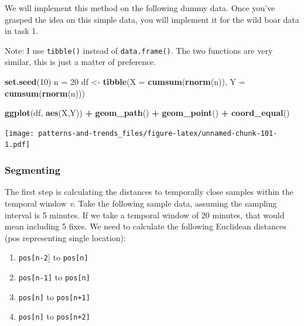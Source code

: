 \documentclass[]{book}
\newenvironment{Shaded}{\begin{snugshade}}{\end{snugshade}}
\newcommand{\KeywordTok}[1]{\textcolor[rgb]{0.13,0.29,0.53}{\textbf{#1}}}
\newcommand{\DataTypeTok}[1]{\textcolor[rgb]{0.13,0.29,0.53}{#1}}
\newcommand{\DecValTok}[1]{\textcolor[rgb]{0.00,0.00,0.81}{#1}}
\newcommand{\StringTok}[1]{\textcolor[rgb]{0.31,0.60,0.02}{#1}}
\newcommand{\OperatorTok}[1]{\textcolor[rgb]{0.81,0.36,0.00}{\textbf{#1}}}
\newcommand{\NormalTok}[1]{#1}
\providecommand{\tightlist}{%
  \setlength{\itemsep}{0pt}\setlength{\parskip}{0pt}}
\begin{document}
We will implement this method on the following dummy data. Once you've
grasped the idea on this simple data, you will implement it for the wild
boar data in task 1.

Note: I use \texttt{tibble()} instead of \texttt{data.frame()}. The two
functions are very similar, this is just a matter of preference.

\begin{Shaded}
\begin{Highlighting}[]
\KeywordTok{set.seed}\NormalTok{(}\DecValTok{10}\NormalTok{)}
\NormalTok{n =}\StringTok{ }\DecValTok{20}
\NormalTok{df <-}\StringTok{ }\KeywordTok{tibble}\NormalTok{(}\DataTypeTok{X =} \KeywordTok{cumsum}\NormalTok{(}\KeywordTok{rnorm}\NormalTok{(n)), }\DataTypeTok{Y =} \KeywordTok{cumsum}\NormalTok{(}\KeywordTok{rnorm}\NormalTok{(n)))}

\KeywordTok{ggplot}\NormalTok{(df, }\KeywordTok{aes}\NormalTok{(X,Y)) }\OperatorTok{+}
\StringTok{  }\KeywordTok{geom_path}\NormalTok{() }\OperatorTok{+}\StringTok{ }
\StringTok{  }\KeywordTok{geom_point}\NormalTok{() }\OperatorTok{+}
\StringTok{  }\KeywordTok{coord_equal}\NormalTok{()}
\end{Highlighting}
\end{Shaded}

\texttt{[image: patterns-and-trends\_files/figure-latex/unnamed-chunk-101-1.pdf]}

\subsubsection{Segmenting}\label{segmenting}

The first step is calculating the distances to temporally close samples
within the temporal window \emph{v}. Take the following sample data,
assuming the sampling interval is 5 minutes. If we take a temporal
window of 20 minutes, that would mean including 5 fixes. We need to
calculate the following Euclidean distances (pos representing single
location):

\begin{enumerate}
\def\labelenumi{\arabic{enumi}.}
\tightlist
\item
  \texttt{pos{[}n-2}{]} to \texttt{pos{[}n{]}}
\item
  \texttt{pos{[}n-1{]}} to \texttt{pos{[}n{]}}
\item
  \texttt{pos{[}n{]}} to \texttt{pos{[}n+1{]}}
\item
  \texttt{pos{[}n{]}} to \texttt{pos{[}n+2{]}}
\end{enumerate}
\end{document}
